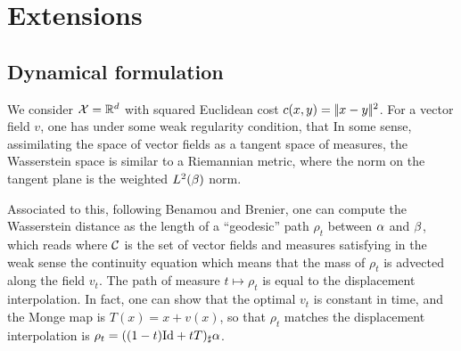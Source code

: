 
\section{Extensions}

\subsection{Dynamical formulation}

We consider $\mathcal{X}=\mathbb{R}^d$ with squared Euclidean cost $c(x,y)=|\!| x-y |\!|^2$.
%
For a vector field $v$, one has under some weak regularity condition, that 
In some sense, assimilating the space of vector fields as a tangent space of measures, the Wasserstein space is similar to a Riemannian metric, where the norm on the tangent plane is the weighted $L^2(\beta)$ norm. 

Associated to this, following Benamou and Brenier, one can compute the Wasserstein distance as the length of a ``geodesic'' path $\rho_t$ between $\alpha$ and $\beta$, which reads
where $\mathcal{C}$ is the set of vector fields and measures satisfying in the weak sense the continuity equation
which means that the mass of $\rho_t$ is advected along the field $v_t$.
%
The path of measure $t \mapsto \rho_t$ is equal to the displacement interpolation. 
%
In fact, one can show that the optimal $v_t$ is constant in time, and the Monge map is $T(x)=x+v(x)$, so that $\rho_t$ matches the displacement interpolation is $\rho_t = ((1-t)\mathrm{Id}+t T)_\sharp \alpha$.

